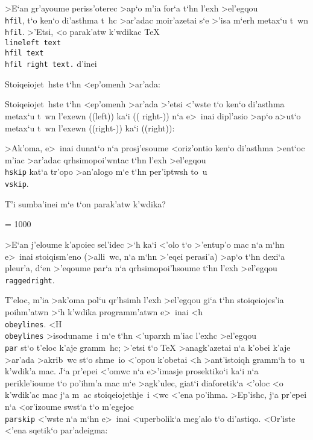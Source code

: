 >E`an gr'ayoume periss'oterec >ap`o m'ia for`a t`hn l'exh >el'egqou {\tt
\\hfil}, t`o ken`o di'asthma t~hc >ar'adac moi\-r'a\-ze\-tai s`e >'isa
m`erh metax`u t~wn {\tt \\hfil}.  >'Etsi, <o parak'atw k'wdikac {\rm
\TeX} {\tt \\line\lb left text \\hfil \centre{} text\\hfil right
text.\rb} d'inei
\medskip
{\rm
{}
}

\exercise Stoiqeiojet~hste t`hn <ep'omenh >ar'ada:\hfil\break
{\rm
{}
}

\exercise Stoiqeiojet~hste t`hn <ep'omenh >ar'ada >'etsi <'wste t`o
ken`o di'asthma metax`u t~wn l'exewn (({\rm left})) ka`i (({\rm
right-\centre{}})) n`a e>~inai dipl'asio >ap`o a>ut`o metax`u t~wn      
l'exewn (({\rm right-\centre{}})) ka`i (({\rm right})):\hfil\break
{\rm
{}
}

>Ak'oma, e>~inai dunat`o n`a prosj'esoume <oriz'ontio ken`o di'asthma
>ent`oc m'iac >ar'adac qrhsimopoi'wntac t`hn l'exh >el'egqou {\tt
\\hskip} kat`a tr'opo >an'alogo m`e t`hn per'iptwsh to~u {\tt \\vskip}. 

\exercise T'i sumba'inei m`e t`on parak'atw k'wdika?\hfil{}
\bigskip

\hbadness = 1000

>E`an j'eloume k'apoiec sel'idec >`h ka`i <'olo t`o >'entup'o   
mac n`a m`hn e>~inai stoiqism'eno (>alli~wc, {\tengs n`a m`hn >'eqei
perasi'a\/}) >ap`o t`hn dexi`a pleur'a, d`en >'eqoume par`a n`a
qrhsimopoi'hsoume t`hn l'exh >el'egqou {\tt \\raggedright}.

T'eloc, m'ia >ak'oma pol`u qr'hsimh l'exh >el'egqou gi`a t`hn
stoiqeiojes'ia poihm'atwn >`h k'wdika programm'atwn e>~inai <h
{\tt\\obeylines}. <H {\tt\\obeylines} >isoduname~i m`e t`hn <'uparxh
m'iac l'exhc >el'egqou {\tt\\par} st`o t'eloc k'aje gramm~hc; >'etsi t`o
{\rm\TeX} >anagk'azetai n`a k'obei k'aje >ar'ada >akrib~wc st`o shme~io
<'opou k'obetai <h >ant'istoiqh gramm`h to~u k'wdik'a mac.  J`a pr'epei
<'omwc n`a e>'imasje prosektiko`i ka`i n`a perikle'ioume t`o po'ihm'a
mac m`e >agk'ulec, giat`i diaforetik`a <'oloc <o k'wdik'ac mac j`a m~ac
stoiqeiojethje~i <wc <'ena po'ihma. >Ep'ishc, j`a pr'epei n`a <or'izoume
swst`a t`o m'egejoc {\tt\\parskip} <'wste n`a m`hn e>~inai <uperbolik`a
meg'alo t`o di'astiqo. <Or'iste <'ena sqetik`o par'adeigma:

